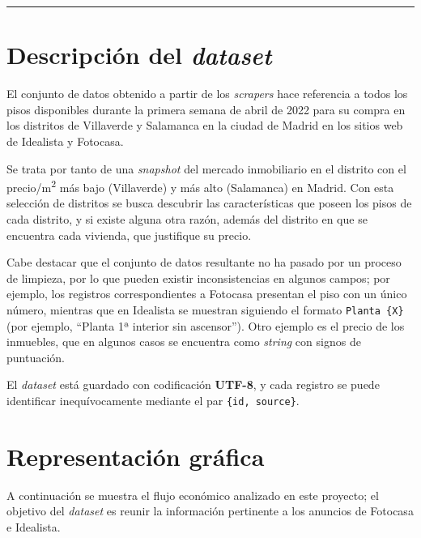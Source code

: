 \documentclass[12pt]{article}
\begin{document}
\begin{center}
	\vspace{-0.5cm}
	{\color{uocblue}\rule{0.75\linewidth}{1pt}}
	\vspace{-0.5cm}
\end{center}

\vspace{-1.5em}\section{Descripción del \textit{dataset}}\vspace{-1.0em}

El conjunto de datos obtenido a partir de los \textit{scrapers} hace referencia a todos los pisos disponibles durante la primera semana de abril de 2022 para su compra en los distritos de Villaverde y Salamanca en la ciudad de Madrid en los sitios web de Idealista y Fotocasa.

Se trata por tanto de una \textit{snapshot} del mercado inmobiliario en el distrito con el precio/m\textsuperscript{2} más bajo (Villaverde) y más alto (Salamanca) en Madrid. Con esta selección de distritos se busca descubrir las características que poseen los pisos de cada distrito, y si existe alguna otra razón, además del distrito en que se encuentra cada vivienda, que justifique su precio.

Cabe destacar que el conjunto de datos resultante no ha pasado por un proceso de limpieza, por lo que pueden existir inconsistencias en algunos campos; por ejemplo, los registros correspondientes a Fotocasa presentan el piso con un único número, mientras que en Idealista se muestran siguiendo el formato \verb|Planta {X}| (por ejemplo, ``Planta 1ª interior sin ascensor''). Otro ejemplo es el precio de los inmuebles, que en algunos casos se encuentra como \textit{string} con signos de puntuación.

El \textit{dataset} está guardado con codificación \textbf{UTF-8}, y cada registro se puede identificar inequívocamente mediante el par \verb|{id, source}|.

\vspace{-1.5em}\section{Representación gráfica}\vspace{-1.0em}

A continuación se muestra el flujo económico analizado en este proyecto; el objetivo del \textit{dataset} es reunir la información pertinente a los anuncios de Fotocasa e Idealista.
\end{document}

